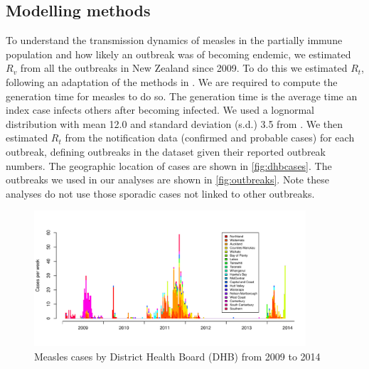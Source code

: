 \documentclass{article}
\begin{document}
\subsection{Modelling methods}
\label{sub:mod_meth}
To understand the transmission dynamics of measles in the partially immune population and how likely an outbreak was of becoming endemic, we estimated $R_v$ from all the outbreaks in New Zealand since 2009. To do this we estimated $R_t$, following an adaptation of the methods in \citep{obidia12,wallinga4}. We are required to compute the generation time for measles to do so. The generation time is the average time an index case infects others after becoming infected. We used a lognormal distribution with mean 12.0 and standard deviation (s.d.) 3.5 from \citep{klinkenberg11}. We then estimated $R_t$ from the notification data (confirmed and probable cases) for each outbreak, defining outbreaks in the dataset given their reported outbreak numbers. The geographic location of cases are shown in \autoref{fig:dhbcases}. The outbreaks we used in our analyses are shown in \autoref{fig:outbreaks}. Note these analyses do not use those sporadic cases not linked to other outbreaks.

\begin{figure}
\begin{center}
     \includegraphics[width=0.9\textwidth]{cases_by_dhb_2009_2014.pdf}
          \end{center}
\caption{Measles cases by District Health Board (DHB) from 2009 to 2014}
     \label{fig:dhbcases}
\end{figure}
\end{document}
